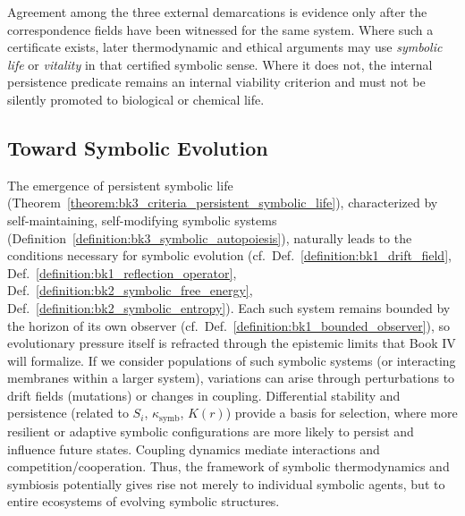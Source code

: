 \begin{scholium}
\label{scholium:bk3_convergent_demarcation}
Agreement among the three external demarcations is evidence only after the
correspondence fields have been witnessed for the same system.  Where such a
certificate exists, later thermodynamic and ethical arguments may use
\emph{symbolic life} or \emph{vitality} in that certified symbolic sense.  Where
it does not, the internal persistence predicate remains an internal viability
criterion and must not be silently promoted to biological or chemical life.
\end{scholium}

\subsection{Toward Symbolic Evolution}

\begin{remark} \label{remark:bk3_toward_symbolic_evolution}
The emergence of persistent symbolic life (Theorem~\ref{theorem:bk3_criteria_persistent_symbolic_life}), characterized by self-maintaining, self-modifying symbolic systems (Definition~\ref{definition:bk3_symbolic_autopoiesis}), naturally leads to the conditions necessary for symbolic evolution (cf.~Def.~\ref{definition:bk1_drift_field}, Def.~\ref{definition:bk1_reflection_operator}, Def.~\ref{definition:bk2_symbolic_free_energy}, Def.~\ref{definition:bk2_symbolic_entropy}). Each such system remains bounded by the horizon of its own observer (cf.~Def.~\ref{definition:bk1_bounded_observer}), so evolutionary pressure itself is refracted through the epistemic limits that Book IV will formalize. If we consider populations of such symbolic systems (or interacting membranes within a larger system), variations can arise through perturbations to drift fields (mutations) or changes in coupling. Differential stability and persistence (related to $S_i$, $\kappa_{\text{symb}}$, $K(r)$) provide a basis for selection, where more resilient or adaptive symbolic configurations are more likely to persist and influence future states. Coupling dynamics mediate interactions and competition/cooperation. Thus, the framework of symbolic thermodynamics and symbiosis potentially gives rise not merely to individual symbolic agents, but to entire ecosystems of evolving symbolic structures.
\end{remark}
